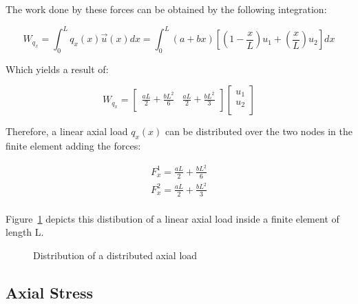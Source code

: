 The work done by these forces can be obtained by the following integration:

\[
  W_{q_x} = \int_{0}^{L} q_x(x) \vec{u}(x) dx = \int_{0}^{L} (a + bx) \left[ \left( 1 - \frac{x}{L} \right) u_1 + \left( \frac{x}{L} \right) u_2 \right] dx
\]

Which yields a result of:

\[
  W_{q_x} =
  \begin{bmatrix}
    \frac{a L}{2} + \frac{b L^2}{6} & \frac{a L}{2} + \frac{b L^2}{3} \\
  \end{bmatrix}
  \begin{bmatrix}
    u_1 \\
    u_2 \\
  \end{bmatrix}
\]

Therefore, a linear axial load $q_x(x)$ can be distributed over the two nodes in the finite element adding the forces:

\begin{equation}
  \begin{split}
    F_x^1 = \frac{a L}{2} + \frac{b L^2}{6} \\
    F_x^2 = \frac{a L}{2} + \frac{b L^2}{3} \\
  \end{split}
\end{equation}

Figure~\ref{fig:axial_finite_element_load_distribution} depicts this distibution of a linear axial load inside a finite element of length L.

\begin{figure}[h]
  \label{fig:axial_finite_element_load_distribution}
  \centering
  \caption{Distribution of a distributed axial load}
\end{figure}


\subsection{Axial Stress}


